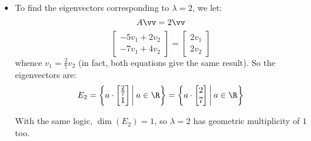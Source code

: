 \begin{solution}
\begin{itemize}
        
             \item To find the eigenvectors corresponding to $\lambda = 2$, we let:
         \[
         A\vv=2 \vv
         \]
         \[
         \begin{bmatrix}
             -5v_1 + 2v_2 \\ -7v_1 + 4v_2
         \end{bmatrix} = \begin{bmatrix}
             2v_1 \\ 2v_2
         \end{bmatrix}
         \]
         whence $v_1=\frac{2}{7}v_2$ (in fact, both equations give the same result). So the eigenvectors are:
         \[
         E_{2} = \left\{ a \cdot \begin{bmatrix}
             \frac{2}{7} \\ 1
         \end{bmatrix} \bigg\vert\: a\in\R \right\} = \left\{ a \cdot \begin{bmatrix}
             2 \\ 7
         \end{bmatrix} \bigg\vert\: a\in\R \right\}
         \]

         With the same logic, $\dim(E_{2})=1$, so $\lambda=2$ has geometric multiplicity of $1$ too.

         \end{itemize}
        
 \end{solution}